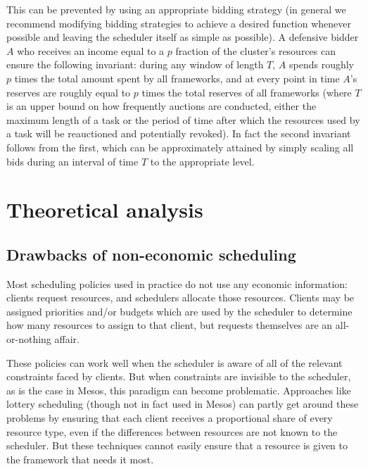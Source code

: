 \documentclass{acm_proc_article-sp}
\begin{document}
This can be prevented by using an appropriate bidding strategy
(in general we recommend modifying bidding strategies to achieve a desired
function whenever possible and leaving the scheduler itself as simple as possible).
A defensive bidder $A$ who receives an income equal to a $p$ fraction
of the cluster's resources can ensure the following invariant:
during any window of length $T$, $A$ spends roughly $p$ times the total amount
spent by all frameworks, and at every point in time $A$'s reserves are roughly equal to $p$
times the total reserves of all frameworks (where $T$ is an upper bound on how frequently auctions are conducted,
either the maximum length of a task or the period of time after which the resources used by a task
will be reauctioned and potentially revoked).
In fact the second invariant follows from the first, which can be approximately attained
by simply scaling all bids during an interval of time $T$ to the appropriate level.

\section{Theoretical analysis}
\label{sec:theory}

\subsection{Drawbacks of non-economic scheduling}\label{drawbacks}
Most scheduling policies used in practice do not use any economic information: clients request resources, and schedulers allocate those resources. Clients may be assigned priorities and/or budgets which are used by the scheduler to determine how many resources to assign to that client, but requests themselves are an all-or-nothing affair.

These policies can work well when the scheduler is aware of all of the relevant constraints faced by clients. But when constraints are invisible to the scheduler, as is the case in Mesos, this paradigm can become problematic. Approaches like lottery scheduling (though not in fact used in Mesos) can partly get around these problems by ensuring that each client receives a proportional share of every resource type, even if the differences between resources are not known to the scheduler. But these techniques cannot easily ensure that a resource is given to the framework that needs it most.
\end{document}
